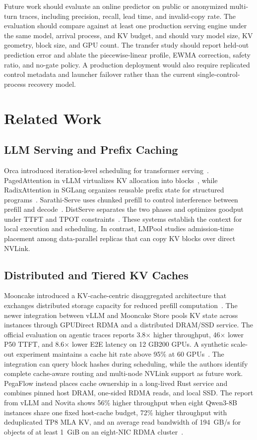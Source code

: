 \documentclass{article}
\newcommand{\sys}{LMPool}
\begin{document}
Future work should evaluate an online predictor on public or anonymized multi-turn traces, including precision, recall, lead time, and invalid-copy rate. The evaluation should compare against at least one production serving engine under the same model, arrival process, and KV budget, and should vary model size, KV geometry, block size, and GPU count. The transfer study should report held-out prediction error and ablate the piecewise-linear profile, EWMA correction, safety ratio, and no-gate policy. A production deployment would also require replicated control metadata and launcher failover rather than the current single-control-process recovery model.

\section{Related Work}
\label{sec:related}

\subsection{LLM Serving and Prefix Caching}

Orca introduced iteration-level scheduling for transformer serving~\citep{ORCA}. PagedAttention in vLLM virtualizes KV allocation into blocks~\citep{vLLM}, while RadixAttention in SGLang organizes reusable prefix state for structured programs~\citep{SGLang}. Sarathi-Serve uses chunked prefill to control interference between prefill and decode~\citep{SarathiServe}. DistServe separates the two phases and optimizes goodput under TTFT and TPOT constraints~\citep{DistServe}. These systems establish the context for local execution and scheduling. In contrast, \sys{} studies admission-time placement among data-parallel replicas that can copy KV blocks over direct NVLink.

\subsection{Distributed and Tiered KV Caches}

Mooncake introduced a KV-cache-centric disaggregated architecture that exchanges distributed storage capacity for reduced prefill computation~\citep{Mooncake}. The newer integration between vLLM and Mooncake Store pools KV state across instances through GPUDirect RDMA and a distributed DRAM/SSD service. The official evaluation on agentic traces reports 3.8$\times$ higher throughput, 46$\times$ lower P50 TTFT, and 8.6$\times$ lower E2E latency on 12 GB200 GPUs. A synthetic scale-out experiment maintains a cache hit rate above 95\% at 60 GPUs~\citep{MooncakeStore}. The integration can query block hashes during scheduling, while the authors identify complete cache-aware routing and multi-node NVLink support as future work. PegaFlow instead places cache ownership in a long-lived Rust service and combines pinned host DRAM, one-sided RDMA reads, and local SSD. The report from vLLM and Novita shows 56\% higher throughput when eight Qwen3-8B instances share one fixed host-cache budget, 72\% higher throughput with deduplicated TP8 MLA KV, and an average read bandwidth of 194~GB/s for objects of at least 1~GiB on an eight-NIC RDMA cluster~\citep{PegaFlow}.
\end{document}
